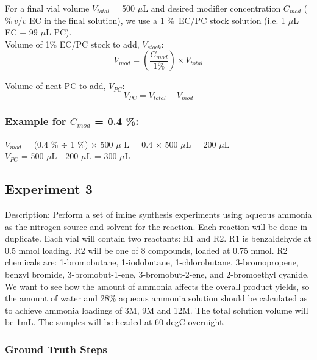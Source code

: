 \documentclass[sn-nature, twocolumn]{sn-jnl}%
\theoremstyle{thmstyleone}%
\theoremstyle{thmstyletwo}%
\theoremstyle{thmstylethree}%
\begin{document}
\noindent For a final vial volume $V_{total}$ = 500 $\mu$L and desired modifier concentration $C_{mod}$ ($\%~v/v$ EC in the final solution), we use a 1 \%~EC/PC stock solution (i.e. 1 $\mu$L EC + 99 $\mu$L PC).\\

\noindent Volume of 1\% EC/PC stock to add, $V_{stock}$:
\begin{equation}
    V_{mod}= \left( \frac{C_{mod} }{1\% } \right) \times V_{total}
\end{equation}

\noindent Volume of neat PC to add, $V_{PC}$:
\begin{equation}
    V_{PC} = V_{total} - V_{mod}
\end{equation}

\subsubsection*{Example for $C_{mod}$ = 0.4 \%:}

$V_{mod}$ = (0.4 \% $\div$ 1 \%) $\times$ 500 $\mu$ L = 0.4 $\times$ 500 $\mu$L = 200 $\mu$L\\
$V_{PC}$ = 500 $\mu$L - 200 $\mu$L = 300 $\mu$L \\


\subsection{Experiment 3}
Description: Perform a set of imine synthesis experiments using aqueous ammonia as the nitrogen source and solvent for the reaction.  Each reaction will be done in duplicate.  Each vial will contain two reactants: R1 and R2.  R1 is benzaldehyde at 0.5 mmol loading.  R2 will be one of 8 compounds, loaded at 0.75 mmol.  R2 chemicals are:  1-bromobutane, 1-iodobutane, 1-chlorobutane, 3-bromopropene, benzyl bromide, 3-bromobut-1-ene, 3-bromobut-2-ene, and 2-bromoethyl cyanide.  We want to see how the amount of ammonia affects the overall product yields, so the amount of water and 28\% aqueous ammonia solution should be calculated as to achieve ammonia loadings of 3M, 9M and 12M.  The total solution volume will be 1mL.  The samples will be headed at 60 degC overnight.

\subsubsection*{Ground Truth Steps}
\end{document}
